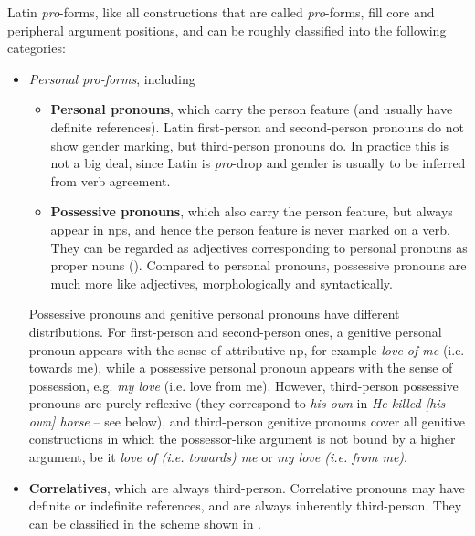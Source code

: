 \documentclass{article}
\newcommand*{\concept}[1]{\textbf{#1}}
\newcommand*{\term}[1]{\emph{#1}}
\newcommand*{\corpus}[1]{\emph{#1}}
\begin{document}
Latin \term{pro}-forms, like all constructions that are called \term{pro}-forms, 
fill core and peripheral argument positions, 
and can be roughly classified into the following categories:
\begin{itemize}
    \item \emph{Personal \term{pro}-forms}, including
    \begin{itemize}
        \item \concept{Personal pronouns}, which carry the person feature (and usually have definite references).
        Latin first-person and second-person pronouns do not show gender marking,
        but third-person pronouns do.
        In practice this is not a big deal,
        since Latin is \term{pro}-drop and 
        gender is usually to be inferred from verb agreement.
        \item \concept{Possessive pronouns}, which also carry the person feature,
        but always appear in \ac{np}s,
        and hence the person feature is never marked on a verb.
        They can be regarded as adjectives corresponding to personal pronouns as proper nouns 
        ().
        Compared to personal pronouns, 
        possessive pronouns are much more like adjectives, morphologically and syntactically. %
    \end{itemize}

    Possessive pronouns and genitive personal pronouns have different distributions.
    For first-person and second-person ones,
    a genitive personal pronoun appears with the sense of attributive \ac{np}, for example
    \corpus{love of me} (i.e. towards me),
    while a possessive personal pronoun appears with the sense of possession,
    e.g. \corpus{my love} (i.e. love from me).
    However, third-person possessive pronouns are purely reflexive 
    (they correspond to \corpus{his own} in \corpus{He killed [his own] horse} -- see below),
    and third-person genitive pronouns cover all genitive constructions 
    in which the possessor-like argument is not bound by a higher argument,
    be it \corpus{love of (i.e. towards) me} or \corpus{my love (i.e. from me)}.

    \item \concept{Correlatives}, which are always third-person. 
    Correlative pronouns may have definite or indefinite references,
    and are always inherently third-person.
    They can be classified in the scheme shown in .


\end{itemize}
\end{document}
